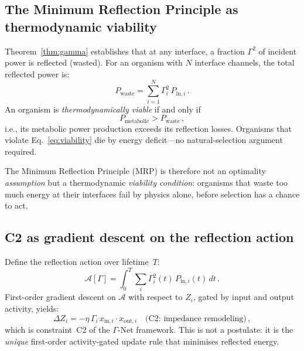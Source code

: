 \documentclass[aps,pre,twocolumn,superscriptaddress,floatfix]{revtex4-2}
\begin{document}
\subsection{The Minimum Reflection Principle as
thermodynamic viability}

Theorem~\ref{thm:gamma} establishes that at any
interface, a fraction $\Gamma^2$ of incident power is
reflected (wasted).
For an organism with $N$ interface channels, the total
reflected power is:
\begin{equation}
  P_{\text{waste}} = \sum_{i=1}^N \Gamma_i^2\,P_{\text{in},i}\,.
  \label{eq:waste}
\end{equation}
An organism is \emph{thermodynamically viable} if and only if
\begin{equation}
  P_{\text{metabolic}} > P_{\text{waste}}\,,
  \label{eq:viability}
\end{equation}
i.e., its metabolic power production exceeds its
reflection losses.  Organisms that violate
Eq.~\eqref{eq:viability} die by energy deficit---no
natural-selection argument required.

The Minimum Reflection Principle (MRP) is therefore not
an optimality \emph{assumption} but a thermodynamic
\emph{viability condition}: organisms that waste too much
energy at their interfaces fail by physics alone, before
selection has a chance to act.

\subsection{C2 as gradient descent on the reflection action}

Define the reflection action over lifetime~$T$:
\begin{equation}
  \mathcal{A}[\Gamma]
  = \int_0^T \sum_i \Gamma_i^2(t)\,P_{\text{in},i}(t)\,dt\,.
  \label{eq:action}
\end{equation}
First-order gradient descent on $\mathcal{A}$ with
respect to $Z_i$, gated by input and output activity,
yields:
\begin{equation}
  \boxed{
  \Delta Z_i = -\eta\,\Gamma_i\,x_{\text{in},i}
  \cdot x_{\text{out},i}
  }
  \quad\text{(C2: impedance remodeling)}\,,
  \label{eq:C2}
\end{equation}
which is constraint~C2 of the $\Gamma$-Net framework.
This is not a postulate: it is the \emph{unique}
first-order activity-gated update rule that minimises
reflected energy.


\end{document}
